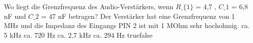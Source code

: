    {Wo liegt die Grenzfrequenz des Audio-Verstärkers, wenn $R\_\{1\}$ = 4,7 \kiloOhm, $C\_1$ = 6,8 nF und $C\_2$ = 47 nF betragen? Der Verstärker hat eine Grenzfrequenz von 1 MHz und die Impedanz des Eingangs PIN 2 ist mit 1 MOhm sehr hochohmig.}
    {ca. 5 kHz}
    {ca. 720 Hz}
    {ca. 2,7 kHz}
    {ca. 294 Hz}
    {true}{false}